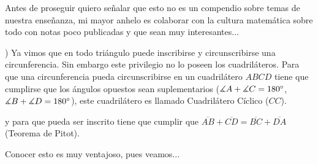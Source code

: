 Antes de proseguir quiero señalar que esto no es un compendio sobre temas de nuestra enseñanza, mi mayor anhelo es colaborar con la cultura matemática sobre todo con notas poco publicadas y que sean muy interesantes...

\vspace{0.5cm}
) Ya vimos que en todo triángulo puede inscribirse y circunscribirse una circunferencia. Sin embargo este privilegio no lo poseen los cuadriláteros. Para que una circunferencia pueda circunscribirse en un cuadrilátero $ABCD$ tiene que cumplirse que los ángulos opuestos sean suplementarios ($\measuredangle A + \measuredangle C = 180\degree$, $\measuredangle B + \measuredangle D = 180\degree$), este cuadrilátero es llamado Cuadrilátero Cíclico ($CC$).

\hspace{2cm} y para que pueda ser inscrito tiene que cumplir que $\overline{AB}+\overline{CD} = \overline{BC}+\overline{DA}$ (Teorema de Pitot).

\vspace{0.5cm}
Conocer esto es muy ventajoso, pues veamos...

